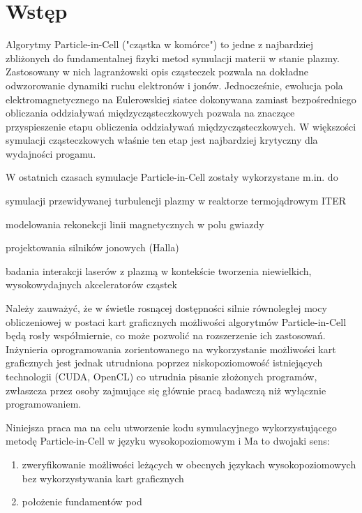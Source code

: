 \section[Wstęp]{Wstęp} %
Algorytmy Particle-in-Cell ("cząstka w komórce") to jedne z najbardziej zbliżonych do fundamentalnej fizyki
metod symulacji materii w stanie plazmy. Zastosowany w nich lagranżowski opis cząsteczek pozwala na dokładne
odwzorowanie dynamiki ruchu elektronów i jonów. Jednocześnie, ewolucja pola elektromagnetycznego na Eulerowskiej
siatce dokonywana zamiast bezpośredniego obliczania oddziaływań międzycząsteczkowych pozwala na znaczące
przyspieszenie etapu obliczenia oddziaływań międzycząsteczkowych. W większości symulacji cząsteczkowych właśnie
ten etap jest najbardziej krytyczny dla wydajności progamu.

W ostatnich czasach symulacje Particle-in-Cell zostały wykorzystane m.in. do
\item symulacji przewidywanej turbulencji plazmy w reaktorze termojądrowym ITER %
\item modelowania rekonekcji linii magnetycznych w polu gwiazdy %
\item projektowania silników jonowych (Halla) %
\item badania interakcji laserów z plazmą w kontekście tworzenia niewielkich,
wysokowydajnych akceleratorów cząstek %

Należy zauważyć, że w świetle rosnącej dostępności silnie równoległej mocy obliczeniowej w postaci kart graficznych %
możliwości algorytmów Particle-in-Cell będą rosły współmiernie, co może pozwolić na rozszerzenie ich zastosowań.
Inżynieria oprogramowania zorientowanego na wykorzystanie możliwości kart graficznych jest jednak utrudniona poprzez
niskopoziomowość %
istniejących technologii (CUDA, OpenCL) %
co utrudnia pisanie złożonych programów, zwłaszcza przez osoby zajmujące się głównie pracą badawczą
niż wyłącznie programowaniem. %

Niniejsza praca ma na celu utworzenie kodu symulacyjnego wykorzystującego metodę Particle-in-Cell w języku
wysokopoziomowym i %
Ma to dwojaki sens:
\begin{enumerate}
    \item zweryfikowanie możliwości leżących w obecnych językach wysokopoziomowych bez wykorzystywania kart graficznych
    \item położenie fundamentów pod
\end{enumerate}
